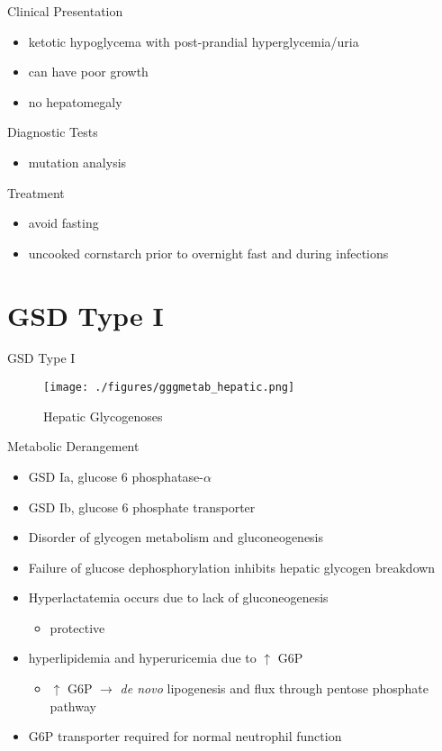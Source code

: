 \documentclass[presentation, smaller]{beamer}
\begin{document}
\begin{frame}[label={sec:orgc462d8b}]{Clinical Presentation}
\begin{itemize}
\item ketotic hypoglycema with post-prandial hyperglycemia/uria
\item can have poor growth
\item no hepatomegaly
\end{itemize}
\end{frame}

\begin{frame}[label={sec:org151c960}]{Diagnostic Tests}
\begin{itemize}
\item mutation analysis
\end{itemize}
\end{frame}
\begin{frame}[label={sec:orge23def1}]{Treatment}
\begin{itemize}
\item avoid fasting
\item uncooked cornstarch prior to overnight fast and during infections
\end{itemize}
\end{frame}
\section{GSD Type I}
\label{sec:org88fc050}
\begin{frame}[label={sec:org47c7d1e}]{GSD Type I}
\begin{figure}[htbp]
\centering
\texttt{[image: ./figures/gggmetab\_hepatic.png]}
\caption[Hepatic Glycogenoses]{\label{fig:org4989af2}
Hepatic Glycogenoses}
\end{figure}
\end{frame}

\begin{frame}[label={sec:org7d26e31}]{Metabolic Derangement}
\begin{itemize}
\item GSD Ia, glucose 6 phosphatase-\(\alpha\)
\item GSD Ib, glucose 6 phosphate transporter
\item Disorder of glycogen metabolism and gluconeogenesis
\item Failure of glucose dephosphorylation inhibits hepatic glycogen breakdown
\item Hyperlactatemia occurs due to lack of gluconeogenesis
\begin{itemize}
\item protective
\end{itemize}
\item hyperlipidemia and hyperuricemia due to \(\uparrow\) G6P
\begin{itemize}
\item \(\uparrow\) G6P \(\to\) \emph{de novo} lipogenesis and flux through pentose phosphate pathway
\end{itemize}
\item G6P transporter required for normal neutrophil function
\end{itemize}
\end{frame}
\end{document}
